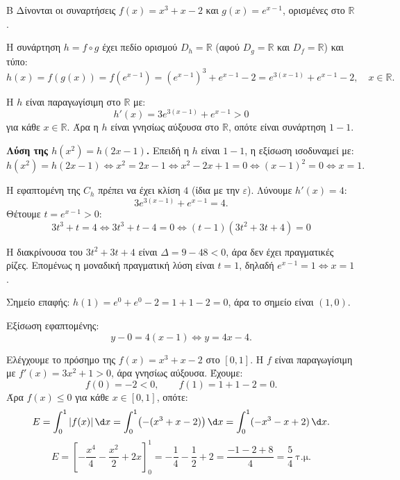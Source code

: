 \begin{thema}{Β}
Δίνονται οι συναρτήσεις $f(x) = x^3 + x - 2$ και $g(x) = e^{x-1}$, ορισμένες στο $\mathbb{R}$.

\begin{erwthma}

\item Η συνάρτηση $h = f \circ g$ έχει πεδίο ορισμού $D_h = \mathbb{R}$ (αφού $D_g = \mathbb{R}$ και $D_f = \mathbb{R}$) και τύπο:
\[
h(x) = f(g(x)) = f(e^{x-1}) = (e^{x-1})^3 + e^{x-1} - 2 = e^{3(x-1)} + e^{x-1} - 2,\quad x\in\mathbb{R}.
\]

\item Η $h$ είναι παραγωγίσιμη στο $\mathbb{R}$ με:
\[
h'(x) = 3e^{3(x-1)} + e^{x-1}>0
\]
για κάθε $x\in\mathbb{R}$. Άρα η $h$ είναι γνησίως αύξουσα στο $\mathbb{R}$, οπότε είναι συνάρτηση $1-1$.

\textbf{Λύση της $h(x^2) = h(2x-1)$.}
Επειδή η $h$ είναι $1-1$, η εξίσωση ισοδυναμεί με:
\[
h(x^2) = h(2x-1)\Leftrightarrow x^2 = 2x - 1 \Leftrightarrow x^2 - 2x + 1 = 0 \Leftrightarrow (x-1)^2 = 0 \Leftrightarrow x = 1.
\]

\item Η εφαπτομένη της $C_h$ πρέπει να έχει κλίση $4$ (ίδια με την $\varepsilon$).
Λύνουμε $h'(x) = 4$:
\[
3e^{3(x-1)} + e^{x-1} = 4.
\]
Θέτουμε $t = e^{x-1} > 0$:
\[
3t^3 + t = 4 \Leftrightarrow 3t^3 + t - 4 = 0\Leftrightarrow(t-1)(3t^2 + 3t + 4)=0\]

Η διακρίνουσα του $3t^2 + 3t + 4$ είναι $\Delta = 9 - 48 < 0$, άρα δεν έχει πραγματικές ρίζες.
Επομένως η μοναδική πραγματική λύση είναι $t = 1$, δηλαδή $e^{x-1} = 1 \Leftrightarrow x = 1$.

Σημείο επαφής: $h(1) = e^0 + e^0 - 2 = 1 + 1 - 2 = 0$, άρα το σημείο είναι $(1, 0)$.

Εξίσωση εφαπτομένης:
\[
y - 0 = 4(x - 1) \Leftrightarrow y = 4x - 4.
\]

\item Ελέγχουμε το πρόσημο της $f(x) = x^3 + x - 2$ στο $[0,1]$.
Η $f$ είναι παραγωγίσιμη με $f'(x) = 3x^2 + 1 > 0$, άρα γνησίως αύξουσα. Έχουμε:
\[
f(0) = -2 < 0, \qquad f(1) = 1 + 1 - 2 = 0.
\]
Άρα $f(x) \leq 0$ για κάθε $x \in [0, 1]$, οπότε:
\[
E = \int_0^1 |f(x)|\,\d x = \int_0^1 \bigl(-(x^3 + x - 2)\bigr)\,\d x = \int_0^1 (-x^3 - x + 2)\,\d x.
\]
\[
E = \left[-\frac{x^4}{4} - \frac{x^2}{2} + 2x\right]_0^1 = -\frac{1}{4} - \frac{1}{2} + 2 = \frac{-1-2+8}{4} = \frac{5}{4}\ \text{τ.μ.}
\]

\end{erwthma}
\end{thema}

